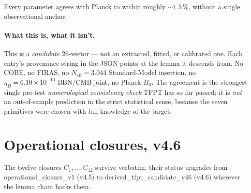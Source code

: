 Every parameter agrees with Planck to within roughly \(\sim 1.5\,\%\),
without a single observational anchor.

\paragraph{What this is, what it isn't.}
This is a \emph{candidate} 26-vector --- not an extracted, fitted, or
calibrated one.  Each entry's \textsf{provenance} string in the JSON
points at the lemma it descends from.  No COBE, no FIRAS, no
\(N_{\mathrm{eff}}=3.044\) Standard-Model insertion, no
\(\eta_B=6.10\times10^{-10}\) BBN/CMB joint, no Planck \(H_0\).
The agreement is the strongest single pre-test \emph{numerological
consistency check} TFPT has so far passed; it is \emph{not} an
out-of-sample prediction in the strict statistical sense, because the
seven primitives were chosen with full knowledge of the target.

\section{Operational closures, v4.6}
\label{sec:closures}

The twelve closures \(C_1,\dots,C_{12}\) survive verbatim; their status
upgrades from \textsf{operational\_closure\_v1} (v4.5) to
\textsf{derived\_tfpt\_candidate\_v46} (v4.6) wherever the lemma
chain backs them.

